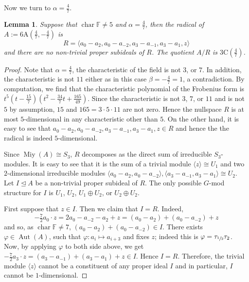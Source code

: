 \documentclass[11pt, a4paper]{article}
\theoremstyle{plain}
\newtheorem{lemma}[theorem]{Lemma}
\theoremstyle{definition}
\newcommand\al{\alpha}
\newcommand\bt{\beta}
\newcommand\la{\langle}
\newcommand\ra{\rangle}
\DeclareMathOperator{\Aut}{Aut}
\DeclareMathOperator{\ch}{char}
\newcommand\FF{\mathbb{F}}
\newcommand{\A}{\mathrm{A}}
\newcommand{\C}{\mathrm{C}}
\DeclareMathOperator{\Miy}{Miy}
\newcommand{\0}{\overline{0}}
\newcommand{\2}{\overline{2}}
\newcommand{\half}{{\tau_{\sfrac{1}{2}}}} %
\renewcommand{\phi}{\varphi}
\newcommand{\1}{\mathbbm{1}}
\begin{document}
Now we turn to $\al = \frac{4}{7}$.


\begin{lemma}\label{6Aideal 4/7}
Suppose that $\ch \FF \neq 5$ and $\al = \frac{4}{7}$, then the radical of $A := 6\A(\frac{4}{7}, -\frac{4}{7})$ is
\[
R = \la a_0 - a_2, a_0 - a_{-2}, a_3 - a_{-1}, a_3 - a_1, z \ra
\]
and there are no non-trivial proper subideals of $R$.  The quotient $A/R$ is $3\C(\frac{4}{7})$.
\end{lemma}
\begin{proof}
Note that $\al = \frac{4}{7}$, the characteristic of the field is not $3$, or $7$.  In addition, the characteristic is not $11$ either as in this case $\bt = -\frac{4}{7} = 1$, a contradiction.  By computation, we find that the characteristic polynomial of the Frobenius form is $t^5(t - \frac{15}{7})(t^2 - \frac{34}{7}t + \frac{165}{49})$.  Since the characteristic is not $3$, $7$, or $11$ and is not $5$ by assumption, $15$ and $165 = 3\cdot 5 \cdot 11$ are not zero.  Hence the nullspace $R$ is at most $5$-dimensional in any characteristic other than $5$.  On the other hand, it is easy to see that $a_0 - a_2, a_0 - a_{-2}, a_3 - a_{-1}, a_3 - a_1, z \in R$ and hence the the radical is indeed $5$-dimensional.

Since $\Miy(A) \cong S_3$, $R$ decomposes as the direct sum of irreducible $S_3$-modules.  It is easy to see that it is the sum of a trivial module $\la z \ra \cong U_1$ and two $2$-dimensional irreducible modules $\langle a_0 - a_2, a_0 - a_{-2} \rangle, \langle a_3 - a_{-1}, a_3 - a_1 \rangle \cong U_2$.  Let $I \trianglelefteq A$ be a non-trivial proper subideal of $R$. The only possible $G$-mod structure for $I$ is $U_1$, $U_2$, $U_1 \oplus U_2$, or $U_2 \oplus U_2$.

First suppose that $z \in I$.  Then we claim that $I = R$.  Indeed,
\begin{equation}\label{6A 4/7 eqn z}
-\tfrac{7}{2} a_0 \cdot z = 2a_0 - a_{-2} - a_2 + z = (a_0 - a_2) + (a_0 -a_{-2}) + z
\end{equation}
and so, as $\ch \FF \neq 7$, $(a_0 - a_2) + (a_0 -a_{-2}) \in I$.  There exists $\phi \in \Aut(A)$, such that $\phi \colon a_i \mapsto a_{i+3}$ and fixes $z$; indeed this is $\phi = \half \tau_2$.  Now, by applying $\phi$ to both side above, we get $-\tfrac{7}{2} a_3 \cdot z = (a_3 -a_{-1}) + (a_3 - a_1) +z \in I$. Hence $I = R$.  Therefore, the trivial module $\la z \ra$ cannot be a constituent of any proper ideal $I$ and in particular, $I$ cannot be $1$-dimensional.


\end{proof}
\end{document}
